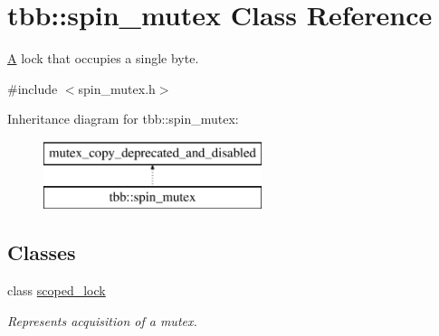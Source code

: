 \hypertarget{classtbb_1_1spin__mutex}{}\section{tbb\+:\+:spin\+\_\+mutex Class Reference}
\label{classtbb_1_1spin__mutex}


\hyperlink{structA}{A} lock that occupies a single byte.  




{\ttfamily \#include $<$spin\+\_\+mutex.\+h$>$}

Inheritance diagram for tbb\+:\+:spin\+\_\+mutex\+:\begin{figure}[H]
\begin{center}
\leavevmode
\includegraphics[height=2.000000cm]{classtbb_1_1spin__mutex}
\end{center}
\end{figure}
\subsection*{Classes}
\begin{DoxyCompactItemize}
\item 
class \hyperlink{classtbb_1_1spin__mutex_1_1scoped__lock}{scoped\+\_\+lock}
\begin{DoxyCompactList}\small\item\em Represents acquisition of a mutex. \end{DoxyCompactList}\end{DoxyCompactItemize}
